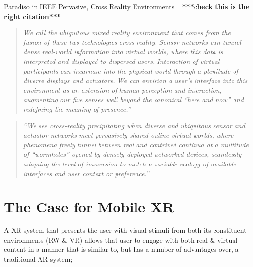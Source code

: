 Paradiso in IEEE Pervasive, Cross Reality Environments ~\cite{Paradiso2009} \textbf{***check this is the right citation***}

\begin{quote}
\textit{We call the ubiquitous mixed reality environment that comes from the fusion of these two technologies cross-reality. Sensor networks can tunnel dense real-world information into virtual worlds, where this data is interpreted and displayed to dispersed users. Interaction of virtual participants can incarnate into the physical world through a plenitude of diverse displays and actuators. We can envision a user's interface into this environment as an extension of human perception and interaction, augmenting our five senses well beyond the canonical ``here and now'' and redefining the meaning of presence.''}
\end{quote}



\begin{quote}
\textit{``We see cross-reality precipitating when diverse and ubiquitous sensor and actuator networks meet pervasively shared online virtual worlds, where phenomena freely tunnel between real and contrived continua at a multitude of ``wormholes'' opened by densely deployed networked devices, seamlessly adapting the level of immersion to match a variable ecology of available interfaces and user context or preference.''}~\cite{Lifton2009}
\end{quote}




\section{The Case for Mobile XR}


A XR system that presents the user with visual stimuli from both its constituent environments (RW \& VR) allows that user to engage with both real \& virtual content in a manner that is similar to, but has a number of advantages over, a traditional AR system;

